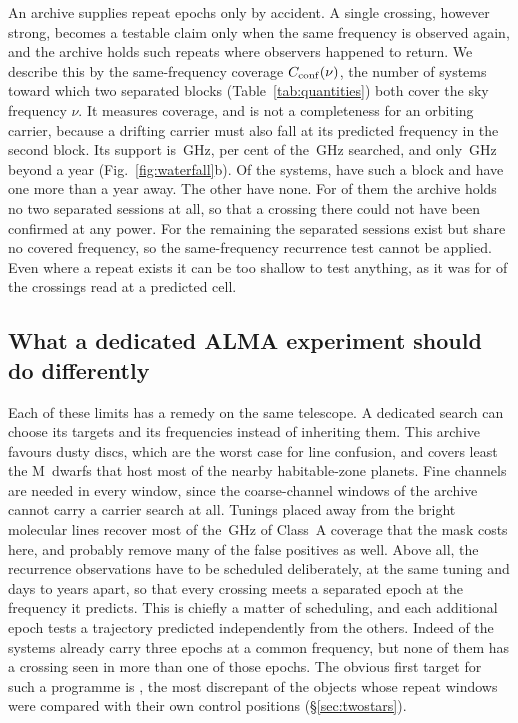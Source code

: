 An archive supplies repeat epochs only by accident. A single crossing,
however strong, becomes a testable claim only when the same frequency is
observed again, and the archive holds such repeats where observers happened
to return. We describe this by the same-frequency coverage
$C_{\rm conf}(\nu)$, the number of systems toward which two separated blocks
(Table~\ref{tab:quantities}) both cover the sky frequency $\nu$. It measures
coverage, and is not a completeness for an orbiting carrier, because a
drifting carrier must also fall at its predicted frequency in the second
block. Its support is \CvConfGHzDay\,GHz, \CvConfPctDay{} per cent of the
\CvUnionA\,GHz searched, and only \CvConfGHzYr\,GHz beyond a year
(Fig.~\ref{fig:waterfall}b). Of the \NSysClassA{} systems, \ZcConfSysDay{}
have such a block and \ZcConfSysYr{} have one more than a year away. The
other \ZcNoRepSys{} have none. For \ZcNoRepNoSep{} of them the archive holds
no two separated sessions at all, so that a crossing there could not have been
confirmed at any power. For the remaining \ZcNoRepNoFreqWord{} the separated
sessions exist but share no covered frequency, so the same-frequency
recurrence test cannot be applied. Even where a repeat exists it can be
too shallow to test anything, as it was for \HjNPowerLo{} of the \RcNExcl{}
crossings read at a predicted cell.

\subsection{What a dedicated ALMA experiment should do differently}
\label{sec:future}

Each of these limits has a remedy on the same telescope. A dedicated search
can choose its targets and its frequencies instead of inheriting them. This
archive favours dusty discs, which are the worst case for line confusion, and
covers least the M~dwarfs that host most of the nearby habitable-zone
planets. Fine channels are needed in every window, since the \NCoarse{}
coarse-channel windows of the archive cannot carry a carrier search at all.
Tunings placed away from the bright molecular lines recover most of the
\MkMaskAGHz\,GHz of Class~A coverage that the mask costs here, and probably
remove many of the false positives as well. Above all, the recurrence
observations have to be scheduled deliberately, at the same tuning and days
to years apart, so that every crossing meets a separated epoch at the
frequency it predicts. This is chiefly a matter of scheduling, and each
additional epoch tests a trajectory predicted independently from the others.
Indeed \PaNSysThree{} of the \NSysClassA{} systems already carry three epochs
at a common frequency, but none of them has a crossing seen in more than one
of those epochs. The obvious first target for such a programme is \BkAlmaName, the most
discrepant of the objects whose repeat windows were compared with their own
control positions (\S\ref{sec:twostars}).
